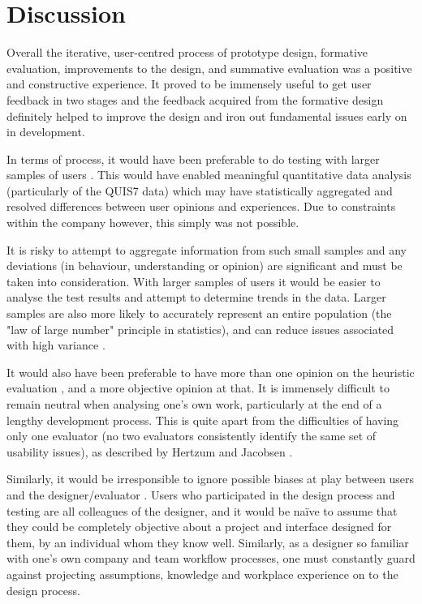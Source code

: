 \section{Discussion}
Overall the iterative, user-centred process of prototype design, formative evaluation, improvements to the design, and summative evaluation was a positive and constructive experience. It proved to be immensely useful to get user feedback in two stages and the feedback acquired from the formative design definitely helped to improve the design and iron out fundamental issues early on in development.

In terms of process, it would have been preferable to do testing with larger samples of users \citep{Faulkner}. This would have enabled meaningful quantitative data analysis (particularly of the QUIS7 data) which may have statistically aggregated and resolved differences between user opinions and experiences. Due to constraints within the company however, this simply was not possible. 

It is risky to attempt to aggregate information from such small samples \citep{Dicks} and any deviations (in behaviour, understanding or opinion) are significant and must be taken into consideration. With larger samples of users it would be easier to analyse the test results and attempt to determine trends in the data. Larger samples are also more likely to accurately represent an entire population (the "law of large number" principle in statistics), and can reduce issues associated with high variance \citep[p. 132 \& 235]{Gravetter}. 

It would also have been preferable to have more than one opinion on the heuristic evaluation \citep{NielsenHow}, and a more objective opinion at that. It is immensely difficult to remain neutral when analysing one's own work, particularly at the end of a lengthy development process. This is quite apart from the difficulties of having only one evaluator (no two evaluators consistently identify the same set of usability issues), as described by Hertzum and Jacobsen \citep{Hertzum}. 

Similarly, it would be irresponsible to ignore possible biases at play between users and the designer/evaluator \citep{Dumas}. Users who participated in the design process and testing are all colleagues of the designer, and it would be na\"{i}ve to assume that they could be completely objective about a project and interface designed for them, by an individual whom they know well. Similarly, as a designer so familiar with one's own company and team workflow processes, one must constantly guard against projecting assumptions, knowledge and workplace experience on to the design process.

